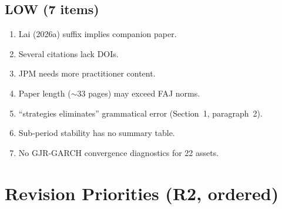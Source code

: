 \documentclass[12pt,a4paper]{article}
\begin{document}
\subsection*{\textcolor{lowsev}{LOW (7 items)}}

\begin{enumerate}[label=\textcolor{lowsev}{\textbf{L\arabic*}}]
\item Lai (2026a) suffix implies companion paper.
\item Several citations lack DOIs.
\item JPM needs more practitioner content.
\item Paper length ($\sim$33 pages) may exceed FAJ norms.
\item ``strategies eliminates'' grammatical error (Section~1, paragraph~2).
\item Sub-period stability has no summary table.
\item No GJR-GARCH convergence diagnostics for 22 assets.
\end{enumerate}


\section{Revision Priorities (R2, ordered)}
\label{sec:priorities}
\end{document}

